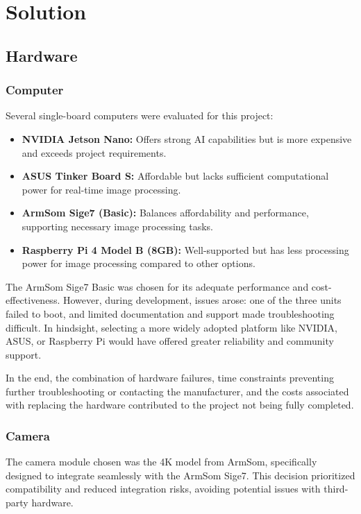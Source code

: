 \chapter{Solution}

\section{Hardware}

\subsection{Computer}
Several single-board computers were evaluated for this project:
\begin{itemize}
	\item \textbf{NVIDIA Jetson Nano:} Offers strong AI capabilities but is more expensive and exceeds project requirements.
	\item \textbf{ASUS Tinker Board S:} Affordable but lacks sufficient computational power for real-time image processing.
	\item \textbf{ArmSom Sige7 (Basic):} Balances affordability and performance, supporting necessary image processing tasks.
	\item \textbf{Raspberry Pi 4 Model B (8GB):} Well-supported but has less processing power for image processing compared to other options.
\end{itemize}

The ArmSom Sige7 Basic was chosen for its adequate performance and cost-effectiveness. However, during development, issues arose: one of the three units failed to boot, and limited documentation and support made troubleshooting difficult. In hindsight, selecting a more widely adopted platform like NVIDIA, ASUS, or Raspberry Pi would have offered greater reliability and community support.

In the end, the combination of hardware failures, time constraints preventing further troubleshooting or contacting the manufacturer, and the costs associated with replacing the hardware contributed to the project not being fully completed.


\subsection{Camera}
The camera module chosen was the 4K model from ArmSom, specifically designed to integrate seamlessly with the ArmSom Sige7. This decision prioritized compatibility and reduced integration risks, avoiding potential issues with third-party hardware. 

